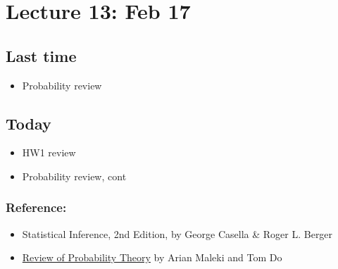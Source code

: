 \setcounter{section}{12}


\section{Lecture 13: Feb 17}


\subsection*{Last time}
\begin{itemize}
  \item Probability review
\end{itemize}


\subsection*{Today}
\begin{itemize}
 \item HW1 review 
 \item Probability review, cont 
\end{itemize}

\subsubsection*{Reference: }
\begin{itemize}
  \item Statistical Inference, 2nd Edition, by George Casella \& Roger L. Berger
  \item  \href{http://cs229.stanford.edu/section/cs229-prob.pdf}{Review of Probability Theory} by Arian Maleki and Tom Do
\end{itemize}


